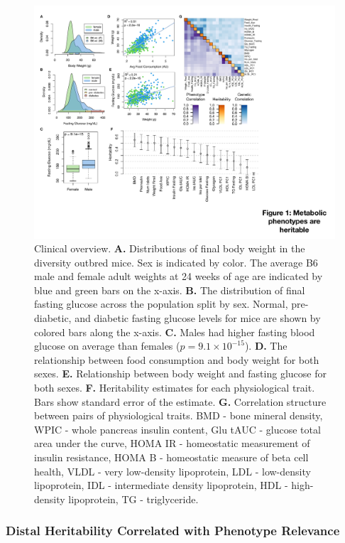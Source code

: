 \documentclass[
]{article}
\begin{document}
\begin{figure}[ht!]
\includegraphics[width=\textwidth]{Figures/Fig1_trait_overview.pdf} 
\caption{Clinical overview. \textbf{A.} Distributions of 
final body weight in the diversity outbred mice. Sex is indicated by 
color. The average B6 male and female adult weights at 24 weeks of 
age are indicated by blue and green bars on the x-axis. \textbf{B.} 
The distribution of final fasting glucose across the population split 
by sex. Normal, pre-diabetic, and diabetic fasting glucose levels 
for mice are shown by colored bars along the x-axis. \textbf{C.} 
Males had higher fasting blood glucose on average than females 
($p = 9.1\times10^{-15}$). \textbf{D.} The relationship between 
food consumption and body weight for both sexes. \textbf{E.} 
Relationship between body weight and fasting glucose for both 
sexes. \textbf{F.} Heritability estimates for each physiological 
trait. Bars show standard error of the estimate. \textbf{G.} 
Correlation structure between pairs of physiological traits.
BMD - bone mineral density, WPIC - whole pancreas insulin content, 
Glu tAUC - glucose total area under the curve, HOMA IR - homeostatic 
measurement of insulin resistance, HOMA B - homeostatic measure of 
beta cell health, VLDL - very low-density lipoprotein,
LDL - low-density lipoprotein, IDL - intermediate density lipoprotein, 
HDL - high-density lipoprotein, TG - triglyceride.
}
\label{fig:trait_overview}
\end{figure}

\subsubsection{Distal Heritability Correlated with Phenotype
Relevance}\label{distal-heritability-correlated-with-phenotype-relevance}
\end{document}

